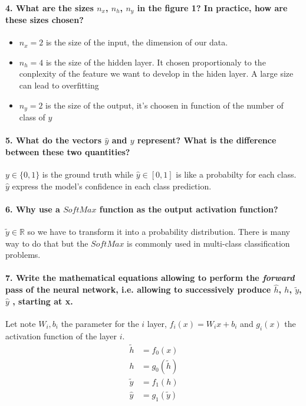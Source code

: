 \documentclass{article}
\theoremstyle{plain}%
\theoremstyle{definition}
\theoremstyle{remark}
\begin{document}
\paragraph{4. What are the sizes $n_x$, $n_h$, $n_y$ in the figure 1? In practice, how are these sizes chosen?}
\begin{itemize}
    \item $ n_x = 2 $ is the size of the input, the dimension of our data. 
    \item $ n_h = 4 $ is the size of the hidden layer. It chosen proportionaly to the conplexity of the feature we want to develop in the hiden layer. A large size can lead to overfitting
    \item $ n_y = 2 $  is the size of the output, it's choosen in function of the number of class of $ y $
\end{itemize}
    
\paragraph{5. What do the vectors $\hat{y}$ and $y$ represent? What is the difference between these two quantities?}
$y \in \{0,1\} $ is the ground truth while $ \hat{y} \in [0,1] $ is like a probabilty for each class. $ \hat{y} $ express the model's confidence in each class prediction. 

\paragraph{6. Why use a $SoftMax$ function as the output activation function?}
$ \tilde{y} \in \mathbb{R} $ so we have to transform it into a probability distribution. There is many way to do that but the $SoftMax$ is commonly used in multi-class classification problems.



\paragraph{7. Write the mathematical equations allowing to perform the \textit{forward} pass of the neural network, i.e. allowing to successively produce $\hat{h}$, $ h $, $ \tilde{y} $, $ \hat{y} $  ,  starting at x.}
Let note $ W_i, b_i $ the parameter for the $ i $ layer, $ f_i(x) = W_i x + b_i$ and $ g_i(x) $ the activation function of the layer $ i $.
\begin{align*}
    \tilde{h} &= f_0(x) \\
    h &= g_0(\tilde{h}) \\
    \tilde{y} &= f_1(h) \\
    \hat{y} &= g_1(\tilde{y})
\end{align*}
\end{document}
